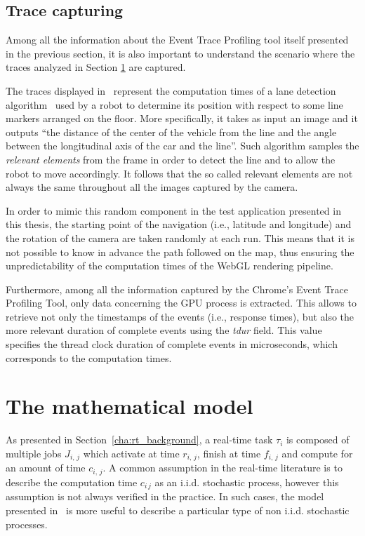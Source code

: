 \subsection{Trace capturing}
Among all the information about the Event Trace Profiling tool itself presented
in the previous section, it is
also important to understand the scenario where the traces analyzed in Section
\ref{sec:math_model} are captured.

The traces displayed in~\cite{villalba2017probabilistic} represent the computation
times of a lane detection algorithm~\cite{fontanelli2014vision} used by a robot
to determine its position with respect to some line markers arranged on the floor.
More specifically, it takes as input an image and it outputs ``the distance
of the center of the vehicle from the line and the angle between the longitudinal
axis of the car and the line''. Such algorithm samples the \emph{relevant elements}
from the frame in order to detect the line and to allow the robot to move accordingly.
It follows that the so called relevant elements are not always the same throughout
all the images captured by the camera.

In order to mimic this random component in the test application presented in this
thesis, the starting point of the navigation (i.e., latitude and longitude) and
the rotation of the camera are taken randomly at each run.
This means that it is not possible to know in advance the path followed on the
map, thus ensuring the unpredictability of the computation times of the WebGL
rendering pipeline.

Furthermore, among all the information captured by the
Chrome's Event Trace Profiling Tool, only data concerning the GPU process is
extracted. This allows to retrieve not only the timestamps of the events (i.e.,
response times), but also the more relevant duration of complete events using
the \emph{tdur} field. This value specifies the thread clock duration of complete
events in microseconds, which corresponds to the computation times.


\section{The mathematical model}\label{sec:math_model}
As presented in Section~\ref{cha:rt_background}, a real-time task \(\tau_{i}\) is composed of multiple jobs
\(J_{i,\,j}\) which activate at time \(r_{i,\,j}\), finish at time \(f_{i,\,j}\)
and compute for an amount of time \(c_{i,\,j}\). A common assumption in the real-time literature is to describe the computation time \(c_{i\,j}\) as an i.i.d. stochastic process, however this assumption is not always verified in the practice. In such cases, the model presented in~\cite{villalba2017probabilistic} is more useful to describe a particular type of non i.i.d. stochastic processes.

